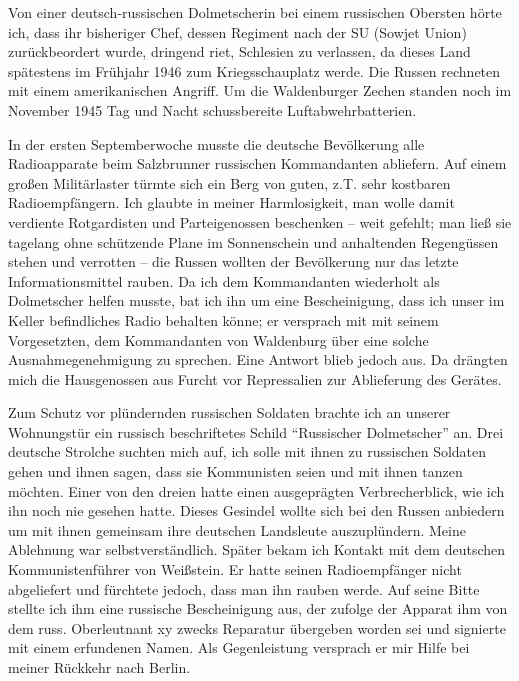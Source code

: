 \documentclass[a5paper,pagesize,10pt,twoside=true]{scrbook}
\renewcommand{\marginpar}[2][]{}
\begin{document}
Von einer deutsch-russischen Dolmetscherin bei einem russischen Obersten hörte ich, dass ihr bisheriger Chef, dessen Regiment nach der SU (Sowjet Union) zurückbeordert wurde, \marginpar{112} dringend riet, Schlesien zu verlassen, da dieses Land spätestens im Frühjahr 1946 zum Kriegsschauplatz werde. Die Russen rechneten mit einem amerikanischen Angriff. Um die Waldenburger Zechen standen noch im November 1945 Tag und Nacht schussbereite Luftabwehrbatterien.

\marginpar{siehe Seite 81/82} In der ersten Septemberwoche musste die deutsche Bevölkerung alle Radioapparate beim Salzbrunner russischen Kommandanten abliefern. Auf einem großen Militärlaster türmte sich ein Berg von guten, z.T. sehr kostbaren Radioempfängern. Ich glaubte in meiner Harmlosigkeit, man wolle damit verdiente Rotgardisten und Parteigenossen beschenken -- weit gefehlt; man ließ sie tagelang ohne schützende Plane im Sonnenschein und anhaltenden Regengüssen stehen und verrotten -- die Russen wollten der Bevölkerung nur das letzte Informationsmittel rauben. Da ich dem Kommandanten wiederholt als Dolmetscher helfen musste, bat ich ihn um eine Bescheinigung, dass ich unser im Keller befindliches Radio behalten könne; er versprach mit mit seinem Vorgesetzten, dem Kommandanten von Waldenburg über eine solche Ausnahmegenehmigung zu sprechen. Eine Antwort \marginpar{113} blieb jedoch aus. Da drängten mich die Hausgenossen aus Furcht vor Repressalien zur Ablieferung des Gerätes.

Zum Schutz vor plündernden russischen Soldaten brachte ich an unserer Wohnungstür ein russisch beschriftetes Schild \enquote{Russischer Dolmetscher} an. Drei deutsche Strolche suchten mich auf, ich solle mit ihnen zu russischen Soldaten gehen und ihnen sagen, dass sie Kommunisten seien und mit ihnen tanzen möchten. Einer von den dreien hatte einen ausgeprägten Verbrecherblick, wie ich ihn noch nie gesehen hatte. Dieses Gesindel wollte sich bei den Russen anbiedern um mit ihnen gemeinsam ihre deutschen Landsleute auszuplündern. Meine Ablehnung war selbstverständlich. Später bekam ich Kontakt mit dem deutschen Kommunistenführer von Weißstein. Er hatte seinen Radioempfänger nicht abgeliefert und fürchtete jedoch, dass man ihn rauben werde. Auf seine Bitte stellte ich ihm eine russische Bescheinigung aus, der zufolge der Apparat ihm von dem russ. Oberleutnant xy zwecks Reparatur übergeben worden sei und signierte mit einem erfundenen Namen. Als Gegenleistung versprach er mir Hilfe bei meiner Rückkehr nach Berlin. \marginpar{Ende Einschub}
\end{document}
